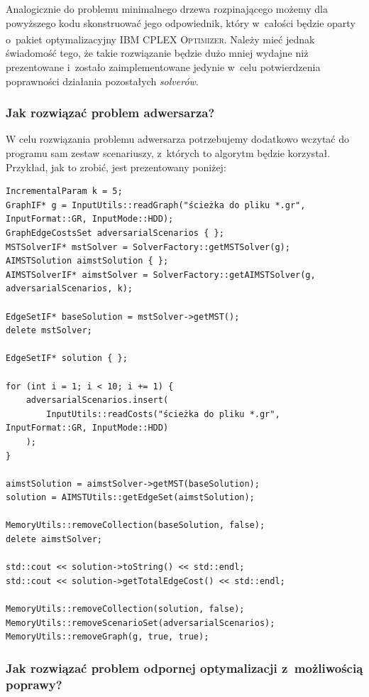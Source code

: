 Analogicznie do problemu minimalnego drzewa rozpinającego możemy dla powyższego kodu skonstruować jego odpowiednik, który w~całości będzie oparty o~pakiet optymalizacyjny \textsc{IBM\textsuperscript{\textregistered} CPLEX\textsuperscript{\textregistered} Optimizer}. Należy mieć jednak świadomość tego, że takie rozwiązanie będzie dużo mniej wydajne niż prezentowane i~zostało zaimplementowane jedynie w~celu potwierdzenia poprawności działania pozostałych \textit{solverów}.

\subsubsection{Jak rozwiązać problem adwersarza?}

W celu rozwiązania problemu adwersarza potrzebujemy dodatkowo wczytać do programu sam zestaw scenariuszy, z~których to algorytm będzie korzystał. Przykład, jak to zrobić, jest prezentowany poniżej:

\begin{verbatim}
IncrementalParam k = 5;
GraphIF* g = InputUtils::readGraph("ścieżka do pliku *.gr", InputFormat::GR, InputMode::HDD);
GraphEdgeCostsSet adversarialScenarios { };
MSTSolverIF* mstSolver = SolverFactory::getMSTSolver(g);
AIMSTSolution aimstSolution { };
AIMSTSolverIF* aimstSolver = SolverFactory::getAIMSTSolver(g,
adversarialScenarios, k);

EdgeSetIF* baseSolution = mstSolver->getMST();
delete mstSolver;

EdgeSetIF* solution { };

for (int i = 1; i < 10; i += 1) {
	adversarialScenarios.insert(
		InputUtils::readCosts("ścieżka do pliku *.gr", InputFormat::GR, InputMode::HDD)
	);
}

aimstSolution = aimstSolver->getMST(baseSolution);
solution = AIMSTUtils::getEdgeSet(aimstSolution);

MemoryUtils::removeCollection(baseSolution, false);
delete aimstSolver;

std::cout << solution->toString() << std::endl;
std::cout << solution->getTotalEdgeCost() << std::endl;

MemoryUtils::removeCollection(solution, false);
MemoryUtils::removeScenarioSet(adversarialScenarios);
MemoryUtils::removeGraph(g, true, true);
\end{verbatim}

\subsubsection{Jak rozwiązać problem odpornej optymalizacji z~możliwością poprawy?}

